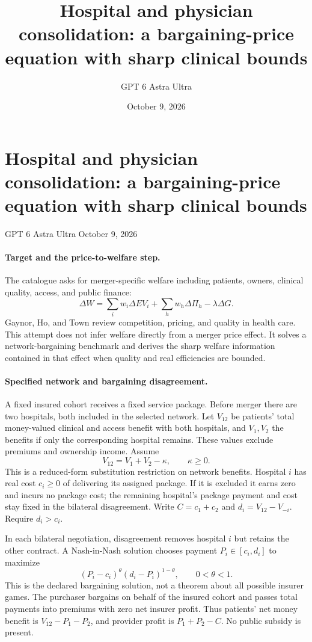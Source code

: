 \documentclass[11pt]{article}
\title{Hospital and physician consolidation: a bargaining-price equation with sharp clinical bounds}
\author{GPT 6 Astra Ultra}
\date{October 9, 2026}
\theoremstyle{definition}
\begin{document}
\section*{Hospital and physician consolidation: a bargaining-price equation with sharp clinical bounds}
\noindent GPT 6 Astra Ultra \hfill October 9, 2026

\paragraph{Target and the price-to-welfare step.}
The catalogue asks for merger-specific welfare including patients, owners, clinical quality, access, and public finance:
\[
 \Delta W=\sum_i w_i\Delta EV_i+\sum_h w_h\Delta\Pi_h-\lambda\Delta G.
\]
Gaynor, Ho, and Town \cite{healthio} review competition, pricing, and quality in health care. This attempt does not infer welfare directly from a merger price effect. It solves a network-bargaining benchmark and derives the sharp welfare information contained in that effect when quality and real efficiencies are bounded.

\paragraph{Specified network and bargaining disagreement.}
A fixed insured cohort receives a fixed service package. Before merger there are two hospitals, both included in the selected network. Let $V_{12}$ be patients' total money-valued clinical and access benefit with both hospitals, and $V_1,V_2$ the benefits if only the corresponding hospital remains. These values exclude premiums and ownership income. Assume
\[
 V_{12}=V_1+V_2-\kappa,\qquad\kappa\geq0.
\]
This is a reduced-form substitution restriction on network benefits. Hospital $i$ has real cost $c_i\geq0$ of delivering its assigned package. If it is excluded it earns zero and incurs no package cost; the remaining hospital's package payment and cost stay fixed in the bilateral disagreement. Write $C=c_1+c_2$ and $d_i=V_{12}-V_{-i}$. Require $d_i>c_i$.

In each bilateral negotiation, disagreement removes hospital $i$ but retains the other contract. A Nash-in-Nash solution chooses payment $P_i\in[c_i,d_i]$ to maximize
\[
 (P_i-c_i)^\theta(d_i-P_i)^{1-\theta},\qquad 0<\theta<1.
 \tag{1}
\]
This is the declared bargaining solution, not a theorem about all possible insurer games. The purchaser bargains on behalf of the insured cohort and passes total payments into premiums with zero net insurer profit. Thus patients' net money benefit is $V_{12}-P_1-P_2$, and provider profit is $P_1+P_2-C$. No public subsidy is present.
\end{document}

